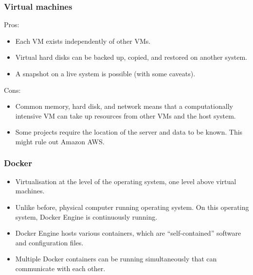 \documentclass[11pt,aspectratio=43,ignorenonframetext,t]{beamer}
\begin{document}
\begin{frame}

\frametitle{Virtual machines}

Pros:
\begin{itemize}
  \item Each VM exists independently of other VMs.
  \item Virtual hard disks can be backed up, copied, and restored on another system.
  \item A snapshot on a live system is possible (with some caveats).
\end{itemize}

Cons:
\begin{itemize}
  \item Common memory, hard disk, and network means that a computationally intensive VM can take up resources from other VMs and the host system.
  \item Some projects require the location of the server and data to be known.  This might rule out Amazon AWS.
\end{itemize}

\end{frame}


\begin{frame}

\frametitle{Docker}

\begin{itemize}
  \item Virtualisation at the level of the operating system, one level above virtual machines.
  \item Unlike before, {} physical computer running {} operating system.  On this operating system, Docker Engine is continuously running.
  \item Docker Engine hosts various containers, which are ``self-contained'' software and configuration files.
  \item Multiple Docker containers can be running simultaneously that can communicate with each other.
\end{itemize}

\end{frame}
\end{document}
